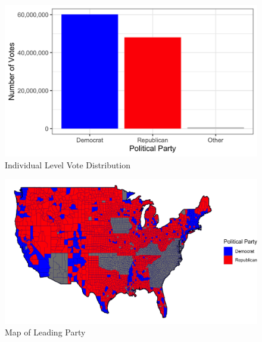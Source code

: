 \documentclass[
]{article}
\begin{document}
\begin{figure}

{\centering \includegraphics[width=0.8\linewidth]{../results/indiv-vote-plot} 

}

\caption{Individual Level Vote Distribution}\label{fig:individual-vote-plot}
\end{figure}

\begin{figure}

{\centering \includegraphics[width=0.8\linewidth]{../results/election-map} 

}

\caption{Map of Leading Party}\label{fig:election-map}
\end{figure}
\end{document}
